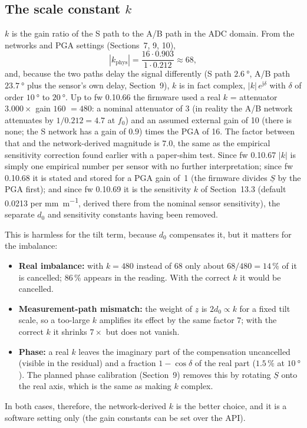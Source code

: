\documentclass[11pt,a4paper]{article}
\begin{document}
\subsection{The scale constant \texorpdfstring{$k$}{k}}

$k$ is the gain ratio of the S path to the A/B path in the ADC domain.  From
the networks and PGA settings (Sections~7, 9, 10),
\begin{equation}
  |k_{\mathrm{phys}}| = \frac{16\cdot 0.903}{1\cdot 0.212} \approx 68 ,
\end{equation}
and, because the two paths delay the signal differently (S path
$\SI{2.6}{\degree}$, A/B path $\SI{23.7}{\degree}$ plus the sensor's own
delay, Section~9), $k$ is in fact complex, $|k|\,e^{\mathrm{j}\delta}$ with
$\delta$ of order $\SI{10}{\degree}$ to $\SI{20}{\degree}$.  Up to fw 0.10.66 the
firmware used a real $k$ = attenuator $3.000\times$ gain $160$ $=480$: a nominal
attenuator of 3 (in reality the A/B network attenuates by $1/0.212=4.7$ at
$f_0$) and an assumed external gain of 10 (there is none; the S network has a
gain of $0.9$) times the PGA of 16.  The factor between that and the
network-derived magnitude is $7.0$, the same as the empirical sensitivity
correction found earlier with a paper-shim test.  Since fw 0.10.67 $|k|$ is
simply one empirical number per sensor with no further interpretation; since
fw 0.10.68 it is stated and stored for a PGA gain of~1 (the firmware divides
$\underline{S}$ by the PGA first); and since fw 0.10.69 it is the sensitivity
$k$ of Section~13.3 (default 0.0213 per \si{\milli\metre\per\metre}, derived there
from the nominal sensor sensitivity), the separate $d_0$ and sensitivity constants
having been removed.

This is harmless for the tilt term, because $d_0$ compensates it, but it
matters for the imbalance:
\begin{itemize}
  \item \textbf{Real imbalance:} with $k=480$ instead of $68$ only about
        $68/480 = 14\,\%$ of it is cancelled; $86\,\%$ appears in the
        reading.  With the correct $k$ it would be cancelled.
  \item \textbf{Measurement-path mismatch:} the weight of $\underline{z}$ is
        $2d_0\propto k$ for a fixed tilt scale, so a too-large $k$ amplifies
        its effect by the same factor $7$; with the correct $k$ it shrinks
        $7\times$ but does not vanish.
  \item \textbf{Phase:} a real $k$ leaves the imaginary part of the
        compensation uncancelled (visible in the residual) and a fraction
        $1-\cos\delta$ of the real part ($1.5\,\%$ at $\SI{10}{\degree}$).
        The planned phase calibration (Section~9) removes this by rotating
        $\underline{S}$ onto the real axis, which is the same as making $k$
        complex.
\end{itemize}
In both cases, therefore, the network-derived $k$ is the better choice, and
it is a software setting only (the gain constants can be set over the API).
\end{document}
